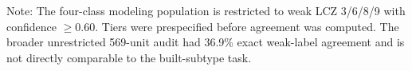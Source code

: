 \begin{table}[!htbp]
\centering
\footnotesize
\caption{Manual-audit exact-class agreement for the four-class modeling population.}
\label{tab:audited_validation}
\begin{minipage}{0.96\textwidth}\vspace{2pt}\scriptsize Note: The four-class modeling population is restricted to weak LCZ 3/6/8/9 with confidence $\geq 0.60$. Tiers were prespecified before agreement was computed. The broader unrestricted 569-unit audit had 36.9\% exact weak-label agreement and is not directly comparable to the built-subtype task.\end{minipage}
\end{table}
